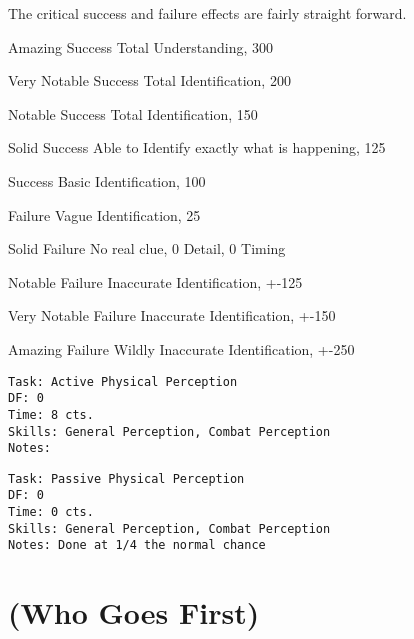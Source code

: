 The critical success and failure effects are fairly straight forward. 

\begin{description}
	\item Amazing Success
        Total Understanding, 300%

	\item Very Notable Success
        Total Identification, 200%

    \item Notable Success
        Total Identification, 150%

	\item Solid Success
        Able to Identify exactly what is happening, 125%

	\item Success
        Basic Identification, 100%

	\item Failure
        Vague Identification, 25%

	\item Solid Failure
        No real clue, 0 Detail, 0 Timing

	\item Notable Failure
        Inaccurate Identification, +-125%

	\item Very Notable Failure
        Inaccurate Identification, +-150%

	\item Amazing Failure
        Wildly Inaccurate Identification, +-250%
\end{description}

\begin{verbatim}
Task: Active Physical Perception  
DF: 0 
Time: 8 cts. 
Skills: General Perception, Combat Perception
Notes: 
\end{verbatim}

\begin{verbatim}
Task: Passive Physical Perception  
DF: 0 
Time: 0 cts. 
Skills: General Perception, Combat Perception
Notes: Done at 1/4 the normal chance 
\end{verbatim}



\section{ (Who Goes First)}

